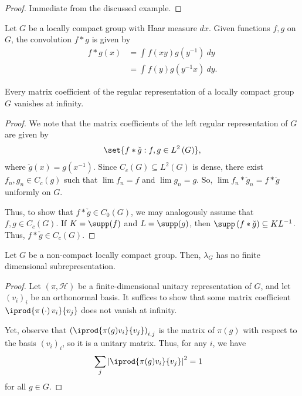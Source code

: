 \documentclass[10pt]{mypackage}
\begin{document}
\begin{proof}
  Immediate from the discussed example.
\end{proof}
\begin{definition}
  Let $G$ be a locally compact group with Haar measure $dx$. Given functions $f,g$ on $G$, the convolution $f\ast g$ is given by
  \begin{align*}
    f\ast g(x) &= \int_{}^{} f\left( xy \right)g\left( y^{-1} \right)\:dy\\
               &= \int_{}^{} f\left( y \right)g\left( y^{-1}x \right)\:dy.
  \end{align*}
\end{definition}
\begin{proposition}
  Every matrix coefficient of the regular representation of a locally compact group $G$ vanishes at infinity.
\end{proposition}
\begin{proof}
  We note that the matrix coefficients of the left regular representation of $G$ are given by
  \begin{align*}
    \set{f\ast \check{g} : f,g\in L^2\left( G \right)},
  \end{align*}
  where $\check{g}(x) = g\left( x^{-1} \right)$. Since $C_c(G)\subseteq L^2(G)$ is dense, there exist $f_n,g_n\in C_c(g)$ such that $\lim f_n = f$ and $\lim g_n = g$. So, $\lim f_n\ast \check{g}_n = f\ast \check{g}$ uniformly on $G$.

  Thus, to show that $f\ast\check{g}\in C_0(G)$, we may analogously assume that $f,g\in C_c(G)$. If $K = \supp(f)$ and $L = \supp(g)$, then $\supp\left( f\ast\check{g} \right) \subseteq KL^{-1}$. Thus, $f\ast\check{g}\in C_c(G)$.
\end{proof}
\begin{corollary}
  Let $G$ be a non-compact locally compact group. Then, $\lambda_G$ has no finite dimensional subrepresentation.
\end{corollary}
\begin{proof}
  Let $\left( \pi,\mathscr{H} \right)$ be a finite-dimensional unitary representation of $G$, and let $\left( v_i \right)_i$ be an orthonormal basis. It suffices to show that some matrix coefficient $ \iprod{\pi\left( \cdot \right)v_i}{v_j} $  does not vanish at infinity.

  Yet, observe that $\left( \iprod{\pi(g)v_i}{v_j} \right)_{i,j}$ is the matrix of $\pi(g)$ with respect to the basis $\left( v_i \right)_i$, so it is a unitary matrix. Thus, for any $i$, we have
  \begin{align*}
    \sum_{j} \left\vert \iprod{\pi(g)v_i}{v_j} \right\vert^2 &= 1
  \end{align*}
  for all $g\in G$.
\end{proof}
\end{document}
